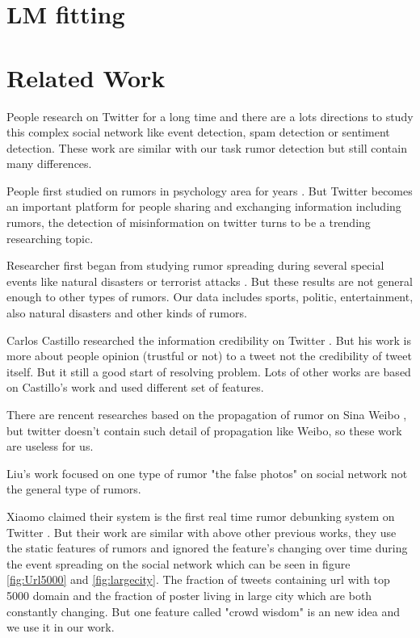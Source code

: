 \section{LM fitting} %


\section{Related Work } %
People research on Twitter for a long time and there are a lots directions  to study this complex social network like event detection\cite{kimmey2015twitter}, spam detection \cite{ahmed2012mcl} \cite{wang2010don} or sentiment detection\cite{barbosa2010robust}. These work are similar with our task rumor detection but still contain many differences.

People first studied on rumors in psychology area for years \cite{allport1947psychology} \cite{sunstein2014rumors}.
But Twitter becomes an important platform for people sharing and exchanging information including rumors, the detection of misinformation on twitter turns to be a trending researching topic. 

Researcher first began from studying rumor spreading during several special events like natural disasters\cite{oh2010exploration} \cite{tanaka2012transmission} or terrorist attacks \cite{starbird2014rumors}. But these results are not general enough to other types of rumors. Our data includes sports, politic, entertainment, also natural disasters and other kinds of rumors. 

Carlos Castillo researched the information credibility on Twitter\cite{mendoza2010twitter} \cite{castillo2011information}\cite{gupta2014tweetcred}. But his work is more about people opinion (trustful or not) to a tweet not the credibility of tweet itself. But it still a good start of resolving problem. Lots of other works are based on Castillo's work \cite{yang2012automatic} \cite{liu2015real} and used different set of features. 

There are rencent researches based on the propagation of rumor on Sina Weibo\cite{yang2012automatic} \cite{wu2015false}, but twitter doesn't contain such detail of propagation like Weibo, so these work are useless for us. 

Liu's work \cite{wu2015false} focused on one type of rumor "the false photos" on social network not the general type of rumors.  

Xiaomo claimed their system is the first real time rumor debunking system on Twitter \cite{liu2015real}. But their work are similar with above other previous works, they use the static features of rumors and ignored the feature's changing over time during the event spreading on the social network which can be seen in figure \ref{fig:Url5000} and \ref{fig:largecity}. The fraction of tweets containing url with top 5000 domain and the fraction of poster living in large city which are both constantly changing. But one feature called "crowd wisdom" is an new idea and we use it in our work.

